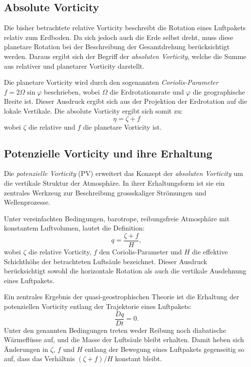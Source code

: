 	\subsection{Absolute Vorticity}

	Die bisher betrachtete relative Vorticity beschreibt die Rotation eines Luftpakets relativ zum Erdboden.
	Da sich jedoch auch die Erde selbst dreht, muss diese planetare Rotation bei der Beschreibung der Gesamtdrehung berücksichtigt werden.
	Daraus ergibt sich der Begriff der \emph{absoluten Vorticity}, welche die Summe aus relativer und planetarer Vorticity darstellt.

	Die planetare Vorticity wird durch den sogenannten \emph{Coriolis-Parameter} \( f = 2 \Omega \sin \varphi \) beschrieben, wobei \( \Omega \) die Erdrotationsrate und \( \varphi \) die geographische Breite ist.
	Dieser Ausdruck ergibt sich aus der Projektion der Erdrotation auf die lokale Vertikale.
	Die absolute Vorticity ergibt sich somit zu:
	\[
		\eta = \zeta + f
	\]
	wobei \( \zeta \) die relative und \( f \) die planetare Vorticity ist.


\subsection{Potenzielle Vorticity und ihre Erhaltung}

Die \emph{potenzielle Vorticity} (PV) erweitert das Konzept der \emph{absoluten Vorticity} um die vertikale Struktur der Atmosphäre. 
In ihrer Erhaltungsform ist sie ein zentrales Werkzeug zur Beschreibung grossskaliger Strömungen und Wellenprozesse.

Unter vereinfachten Bedingungen, barotrope, reibungsfreie Atmosphäre mit konstantem Luftvolumen, lautet die Definition:
\[
    q = \frac{\zeta + f}{H},
\]
wobei \(\zeta\) die relative Vorticity, \(f\) den Coriolis-Parameter und \(H\) die effektive Schichthöhe der betrachteten Luftsäule bezeichnet. 
Dieser Ausdruck berücksichtigt sowohl die horizontale Rotation als auch die vertikale Ausdehnung eines Luftpakets.

Ein zentrales Ergebnis der quasi-geostrophischen Theorie ist die Erhaltung der potenziellen Vorticity entlang der Trajektorie eines Luftpakets:
\[
    \frac{Dq}{Dt} = 0.
\]
Unter den genannten Bedingungen treten weder Reibung noch diabatische Wärmeflüsse auf, und die Masse der Luftsäule bleibt erhalten. 
Damit heben sich Änderungen in \(\zeta\), \(f\) und \(H\) entlang der Bewegung eines Luftpakets gegenseitig so auf, dass das Verhältnis \((\zeta + f)/H\) konstant bleibt.

